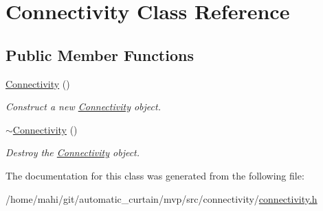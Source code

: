 \hypertarget{classConnectivity}{}\section{Connectivity Class Reference}
\label{classConnectivity}
\subsection*{Public Member Functions}
\begin{DoxyCompactItemize}
\item 
\mbox{\label{classConnectivity_a8097ee69a417d028db02c2aa340b15a4}} 
\hyperlink{classConnectivity_a8097ee69a417d028db02c2aa340b15a4}{Connectivity} ()
\begin{DoxyCompactList}\small\item\em Construct a new \hyperlink{classConnectivity}{Connectivity} object. \end{DoxyCompactList}\item 
\mbox{\label{classConnectivity_a0029e5f1650cb0152256d89595941e6a}} 
\hyperlink{classConnectivity_a0029e5f1650cb0152256d89595941e6a}{$\sim$\+Connectivity} ()
\begin{DoxyCompactList}\small\item\em Destroy the \hyperlink{classConnectivity}{Connectivity} object. \end{DoxyCompactList}\end{DoxyCompactItemize}


The documentation for this class was generated from the following file\+:\begin{DoxyCompactItemize}
\item 
/home/mahi/git/automatic\+\_\+curtain/mvp/src/connectivity/\hyperlink{connectivity_8h}{connectivity.\+h}\end{DoxyCompactItemize}
